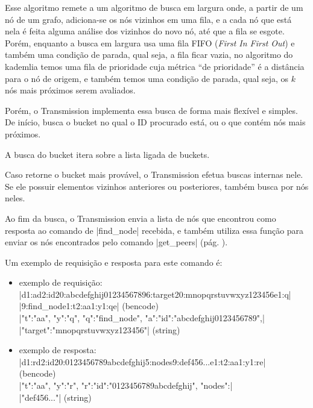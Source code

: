 Esse algoritmo remete a um algoritmo de busca em largura onde, a partir de um nó de um
grafo, adiciona-se os nós vizinhos em uma fila, e a cada nó que está nela é feita alguma
análise dos vizinhos do novo nó, até que a fila se esgote. Porém, enquanto a busca em
largura usa uma fila FIFO (\emph{First In First Out}) e também uma condição de parada,
qual seja, a fila ficar vazia, no algoritmo do \gls*{kademlia} temos uma fila de
prioridade cuja métrica ``de prioridade'' é a distância para o nó de origem, e também
temos uma condição de parada, qual seja, os $k$ nós mais próximos serem avaliados.

Porém, o Transmission implementa essa busca de forma mais flexível e simples. De início,
busca o \gls*{bucket} no qual o ID procurado está, ou o que contém nós mais próximos.


A busca do \gls*{bucket} itera sobre a lista ligada de \glspl*{bucket}.


Caso retorne o \gls*{bucket} mais provável, o Transmission efetua buscas internas nele.
Se ele possuir elementos vizinhos anteriores ou posteriores, também busca por nós neles.


Ao fim da busca, o Transmission envia a lista de nós que encontrou como resposta ao
comando de \sverb|find_node| recebida, e também utiliza essa função para enviar os nós
encontrados pelo comando \sverb|get_peers| (pág. \pageref{subsubsubsec:getpeers}).


Um exemplo de requisição e resposta para este comando é:

\begin{itemize}
    \item exemplo de requisição: \\
        \bverb|d1:ad2:id20:abcdefghij01234567896:target20:mnopqrstuvwxyz123456e1:q| \\
        \bverb|9:find_node1:t2:aa1:y1:qe| (\gls*{bencode}) \\
        \sverb|{"t":"aa", "y":"q", "q":"find_node", "a":{"id":"abcdefghij0123456789",| \\
        \sverb|"target":"mnopqrstuvwxyz123456"}}| (\gls*{string})

    \item exemplo de resposta: \\
        \bverb|d1:rd2:id20:0123456789abcdefghij5:nodes9:def456...e1:t2:aa1:y1:re| \\
        (\gls*{bencode}) \\
        \sverb|{"t":"aa", "y":"r", "r":{"id":"0123456789abcdefghij", "nodes":| \\
        \sverb|"def456..."}}| (\gls*{string})
\end{itemize}